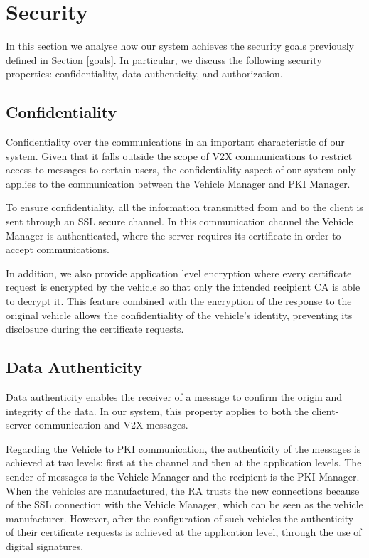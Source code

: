 		\section{Security}
		\label{section:pricacy}
		In this section we analyse how our system achieves the security goals previously defined in Section \ref{goals}. In particular, we discuss the following security properties: confidentiality, data authenticity, and authorization.
		
		\subsection{Confidentiality}
		Confidentiality over the communications in an important characteristic of our system. Given that it falls outside the scope of V2X communications to restrict access to messages to certain users, the confidentiality aspect of our system only applies to the communication between the Vehicle Manager and PKI Manager.
		
		To ensure confidentiality, all the information transmitted from and to the client is sent through an SSL secure channel. In this communication channel the Vehicle Manager is authenticated, where the server requires its certificate in order to accept communications. 
		
		In addition, we also provide application level encryption where every certificate request is encrypted by the vehicle so that only the intended recipient CA is able to decrypt it. This feature combined with the encryption of the response to the original vehicle allows the confidentiality of the vehicle's identity, preventing its disclosure during the certificate requests.
		
		\subsection{Data Authenticity}
		Data authenticity enables the receiver of a message to confirm the origin and integrity of the data. In our system, this property applies to both the client-server communication and V2X messages.
		
		Regarding the Vehicle to PKI communication, the authenticity of the messages is achieved at two levels: first at the channel and then at the application levels. The sender of messages is the Vehicle Manager and the recipient is the PKI Manager. When the vehicles are manufactured, the RA trusts the new connections because of the SSL connection with the Vehicle Manager, which can be seen as the vehicle manufacturer. However, after the configuration of such vehicles the authenticity of their certificate requests is achieved at the application level, through the use of digital signatures.
		
